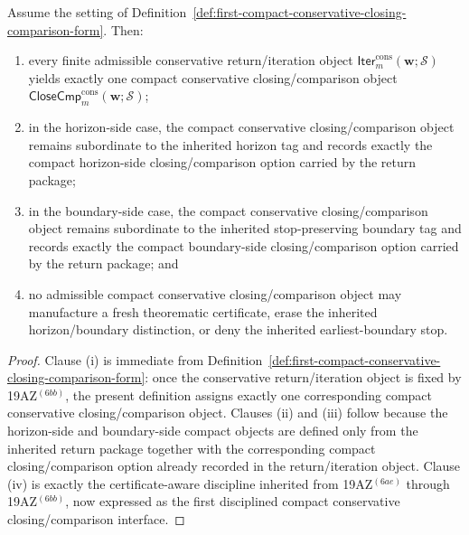 \begin{proposition}
\label{prop:every-finite-admissible-conservative-return-iteration-object-yields-exactly-one-compact-conservative-closing-comparison-object}
Assume the setting of Definition~\ref{def:first-compact-conservative-closing-comparison-form}. Then:
\begin{enumerate}[label=(\roman*)]
 \item every finite admissible conservative return/iteration object \(\mathsf{Iter}^{\mathrm{cons}}_{m}(\mathbf w;\mathcal S)\) yields exactly one compact conservative closing/comparison object \(\mathsf{CloseCmp}^{\mathrm{cons}}_{m}(\mathbf w;\mathcal S)\);
 \item in the horizon-side case, the compact conservative closing/comparison object remains subordinate to the inherited horizon tag and records exactly the compact horizon-side closing/comparison option carried by the return package;
 \item in the boundary-side case, the compact conservative closing/comparison object remains subordinate to the inherited stop-preserving boundary tag and records exactly the compact boundary-side closing/comparison option carried by the return package; and
 \item no admissible compact conservative closing/comparison object may manufacture a fresh theorematic certificate, erase the inherited horizon/boundary distinction, or deny the inherited earliest-boundary stop.
\end{enumerate}
\end{proposition}

\begin{proof}
Clause (i) is immediate from Definition~\ref{def:first-compact-conservative-closing-comparison-form}: once the conservative return/iteration object is fixed by 19AZ$^{(6bb)}$, the present definition assigns exactly one corresponding compact conservative closing/comparison object. Clauses (ii) and (iii) follow because the horizon-side and boundary-side compact objects are defined only from the inherited return package together with the corresponding compact closing/comparison option already recorded in the return/iteration object. Clause (iv) is exactly the certificate-aware discipline inherited from 19AZ$^{(6ae)}$ through 19AZ$^{(6bb)}$, now expressed as the first disciplined compact conservative closing/comparison interface.
\end{proof}

